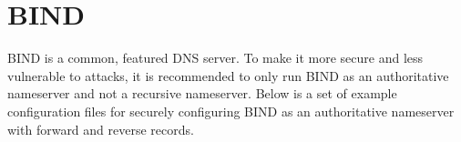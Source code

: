 \section{BIND}

BIND is a common, featured DNS server. To make it more secure and less vulnerable to attacks, it is recommended to only run BIND as an authoritative nameserver and not a recursive nameserver. Below is a set of example configuration files for securely configuring BIND as an authoritative nameserver with forward and reverse records.




